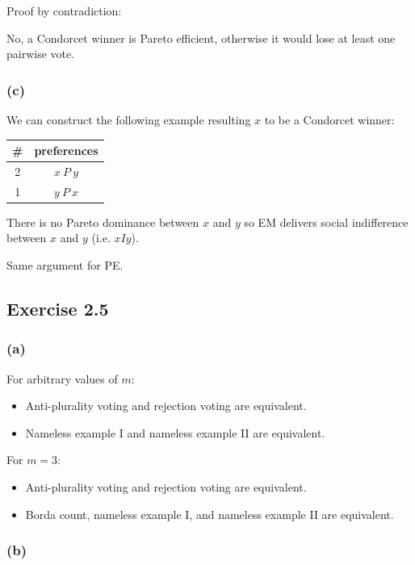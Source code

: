 \documentclass[a4paper]{article}
\begin{document}
Proof by contradiction:

No, a Condorcet winner is Pareto efficient, otherwise it would lose at least one pairwise vote.

\subsubsection*{(c)}

We can construct the following example resulting $x$ to be a Condorcet winner:

\begin{table}[!htbp]
    \centering
    \begin{tabular}{c|c|}
        \# & preferences         \\ 
        \hline
        2  & $x\: P\: y$ \\
        1  & $y\: P\: x$ \\
        \hline
    \end{tabular}
\end{table}

There is no Pareto dominance between $x$ and $y$ so EM delivers social indifference between $x$ and $y$ (i.e. $xIy$).

Same argument for PE.

\subsection*{Exercise 2.5}

\subsubsection*{(a)}

For arbitrary values of $m$:
\begin{itemize}
    \item Anti-plurality voting and rejection voting are equivalent.
    \item Nameless example I and nameless example II are equivalent.
\end{itemize}

For $m=3$:
\begin{itemize}
    \item Anti-plurality voting and rejection voting are equivalent.
    \item Borda count, nameless example I, and nameless example II are equivalent.
\end{itemize}

\subsubsection*{(b)}
\end{document}
